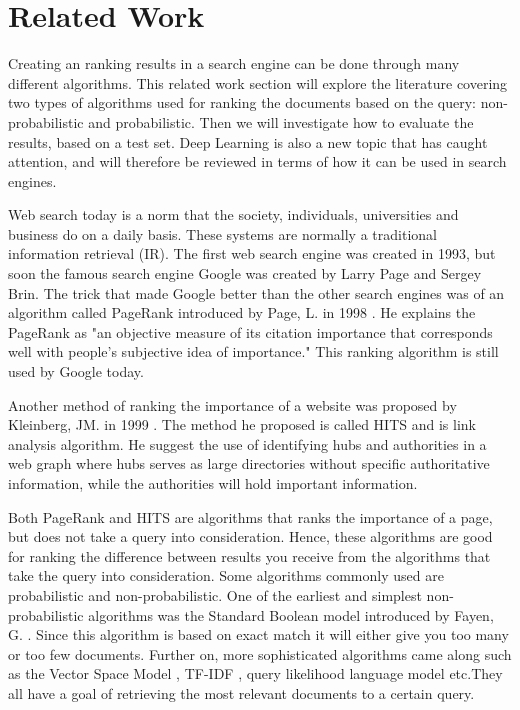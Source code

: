 \section{Related Work}
Creating an ranking results in a search engine can be done through many different algorithms. This related work section will explore the literature covering two types of algorithms used for ranking the documents based on the query: non-probabilistic and probabilistic. Then we will investigate how to evaluate the results, based on a test set. Deep Learning is also a new topic that has caught attention, and will therefore be reviewed in terms of how it can be used in search engines.

Web search today is a norm that the society, individuals, universities and business do on a daily basis. These systems are normally a traditional information retrieval (IR). The first web search engine was created in 1993, but soon the famous search engine Google was created by Larry Page and Sergey Brin. The trick that made Google better than the other search engines was of an algorithm called PageRank introduced by Page, L. in 1998 \cite{brin1998anatomy}. He explains the PageRank as "an objective measure of its citation importance that corresponds well with people’s subjective idea of importance." This ranking algorithm is still used by Google today.

Another method of ranking the importance of a website was proposed by Kleinberg, JM. in 1999 \cite{kleinberg1999authoritative}. The method he proposed is called HITS and is link analysis algorithm. He suggest the use of identifying hubs and authorities in a web graph where hubs serves as large directories without specific authoritative information, while the authorities will hold important information.

Both PageRank and HITS are algorithms that ranks the importance of a page, but does not take a query into consideration. Hence, these algorithms are good for ranking the difference between results you receive from the algorithms that take the query into consideration. Some algorithms commonly used are probabilistic and non-probabilistic. One of the earliest and simplest non-probabilistic algorithms was the Standard Boolean model introduced by Fayen, G. \cite{lancaster1973fayen}. Since this algorithm is based on exact match it will either give you too many or too few documents. Further on, more sophisticated algorithms came along such as the Vector Space Model \cite{salton1975vector}, TF-IDF \cite{salton1983mcgill}, query likelihood language model \cite{zhai2001model} etc.They all have a goal of retrieving the most relevant documents to a certain query.

